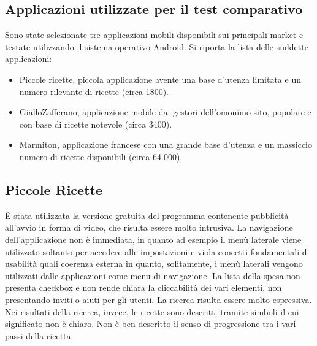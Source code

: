 \subsection{Applicazioni utilizzate per il test comparativo}
Sono state selezionate tre applicazioni mobili disponibili sui principali market
e testate utilizzando il sistema operativo Android.  Si riporta la lista delle
suddette applicazioni:
\begin{itemize}
	\item Piccole ricette\cite{PiccoleRicette}, piccola applicazione avente una base d'utenza
	limitata e un numero rilevante di ricette (circa 1800).
\item GialloZafferano\cite{GialloZafferano}, applicazione mobile dai gestori dell'omonimo
	sito, popolare e con base di ricette notevole (circa 3400).
\item Marmiton\cite{Marmiton}, applicazione francese con una grande base d'utenza e
	un massiccio numero di ricette disponibili (circa 64.000).
\end{itemize}

\subsection{Piccole Ricette}
È stata utilizzata la versione gratuita del programma contenente pubblicità
all'avvio in forma di video, che risulta essere molto intrusiva.  La navigazione
dell'applicazione non è immediata, in quanto ad esempio il menù laterale viene
utilizzato soltanto per accedere alle impostazioni e viola concetti fondamentali
di usabilità quali coerenza esterna in quanto, solitamente,
i menù laterali vengono utilizzati dalle applicazioni come menu di navigazione.
La lista della spesa non presenta checkbox e non rende chiara la cliccabilità
dei vari elementi, non presentando inviti o aiuti per gli utenti.  La ricerca
risulta essere molto espressiva.  Nei risultati della ricerca, invece, le
ricette sono descritti tramite simboli il cui significato non è chiaro.
Non è ben descritto il senso di progressione tra i vari passi della ricetta.

